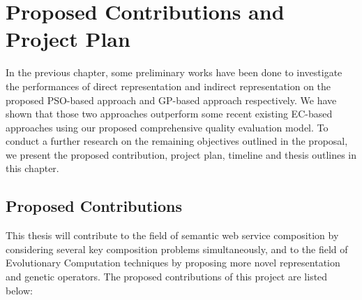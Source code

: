 \chapter{Proposed Contributions and Project Plan}\label{C:plan}
In the previous chapter, some preliminary works have been done to investigate the performances of direct representation and indirect representation on the proposed PSO-based approach and GP-based approach respectively. We have shown that those two approaches outperform some recent existing EC-based approaches using our proposed comprehensive quality evaluation model. To conduct a further research on the remaining objectives outlined in the proposal, we present the proposed contribution, project plan, timeline and thesis outlines in this chapter.

\section{Proposed Contributions}
This thesis will contribute to the field of semantic web service composition by considering several key composition problems simultaneously, and to the field of Evolutionary Computation techniques by proposing more novel representation and genetic operators. The proposed contributions of this project are listed below:

